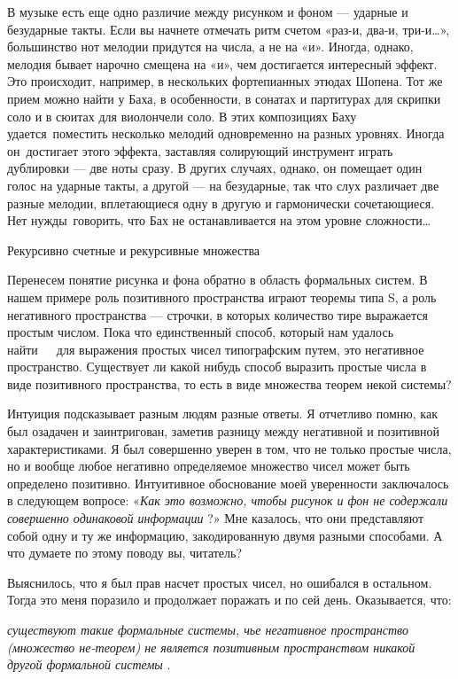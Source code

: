 В музыке есть еще одно различие между рисунком и фоном --- ударные и безударные такты. Если вы начнете отмечать ритм счетом «раз-и, два-и, три-и\ldots», большинство нот мелодии придутся на числа, а не на «и». Иногда, однако, мелодия бывает нарочно смещена на «и», чем достигается интересный эффект. Это происходит, например, в нескольких фортепианных этюдах Шопена. Тот же прием можно найти у Баха, в особенности, в сонатах и партитурах для скрипки соло и в сюитах для виолончели соло. В этих композициях Баху удается~поместить несколько мелодий одновременно на разных уровнях. Иногда он~достигает этого эффекта, заставляя солирующий инструмент играть дублировки --- две ноты сразу. В других случаях, однако, он помещает один голос на ударные такты, а другой --- на безударные, так что слух различает две разные мелодии, вплетающиеся одну в другую и гармонически сочетающиеся. Нет нужды~говорить, что Бах не останавливается на этом уровне сложности\ldots{}

Рекурсивно счетные и рекурсивные множества

Перенесем понятие рисунка и фона обратно в область формальных систем. В нашем примере роль позитивного пространства играют теоремы типа S, а роль негативного пространства --- строчки, в которых количество тире выражается простым числом. Пока что единственный способ, который нам удалось найти~~~для выражения простых чисел типографским путем, это негативное пространство. Существует ли какой нибудь способ выразить простые числа в виде позитивного пространства, то есть в виде множества теорем некой системы?

Интуиция подсказывает разным людям разные ответы. Я отчетливо помню, как был озадачен и заинтригован, заметив разницу между негативной и позитивной характеристиками. Я был совершенно уверен в том, что не только простые числа, но и вообще любое негативно определяемое множество чисел может быть определено позитивно. Интуитивное обоснование моей уверенности заключалось в следующем вопросе: «\emph{Как это возможно, чтобы рисунок и фон не содержали совершенно одинаковой информации} ?» Мне казалось, что они представляют собой одну и ту же информацию, закодированную двумя разными способами. А что думаете по этому поводу вы, читатель?

Выяснилось, что я был прав насчет простых чисел, но ошибался в остальном. Тогда это меня поразило и продолжает поражать и по сей день. Оказывается, что:

\emph{существуют такие формальные системы, чье негативное пространство (множество не-теорем) не является позитивным пространством никакой другой формальной системы} .


